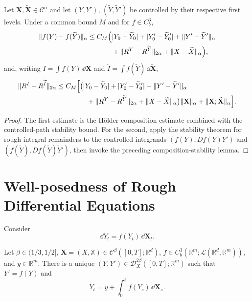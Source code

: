 \begin{lem}
Let $\mathbf X,\widetilde{\mathbf X}\in\mathscr C^\alpha$ and let
$(Y,Y')$, $(\widetilde Y,\widetilde Y')$ be controlled by their respective
first levels.  Under a common bound $M$ and for $f\in C_b^3$,
\begin{align*}
\|f(Y)-f(\widetilde Y)\|_\alpha
\le C_M\Bigl(&|Y_0-\widetilde Y_0|+|Y'_0-\widetilde Y'_0|
 +\|Y'-\widetilde Y'\|_\alpha\\
&+\|R^Y-R^{\widetilde Y}\|_{2\alpha}
 +\|X-\widetilde X\|_\alpha\Bigr),
\end{align*}
and, writing
$I=\int f(Y)\,\dd\mathbf X$ and
$\widetilde I=\int f(\widetilde Y)\,\dd\widetilde{\mathbf X}$,
\begin{align*}
\|R^I-R^{\widetilde I}\|_{2\alpha}
\le C_M\Bigl[&
 \bigl(|Y_0-\widetilde Y_0|+|Y'_0-\widetilde Y'_0|
 +\|Y'-\widetilde Y'\|_\alpha\\
&\quad+\|R^Y-R^{\widetilde Y}\|_{2\alpha}
 +\|X-\widetilde X\|_\alpha\bigr)\|\mathbf X\|_\alpha
 +\|\mathbf X;\widetilde{\mathbf X}\|_\alpha\Bigr].
\end{align*}
\end{lem}

\begin{proof}
The first estimate is the Hölder composition estimate combined with the
controlled-path stability bound.  For the second, apply the stability theorem
for rough-integral remainders to the controlled integrands
$(f(Y),Df(Y)Y')$ and
$(f(\widetilde Y),Df(\widetilde Y)\widetilde Y')$, then invoke the preceding
composition-stability lemma.
\end{proof}

\section{Well-posedness of Rough Differential Equations}

Consider
\[
  \dd Y_t=f(Y_t)\,\dd\mathbf X_t.
\]

\begin{thm}
Let $\beta\in(1/3,1/2]$,
$\mathbf X=(X,\mathbb X)\in\mathscr C^\beta([0,T];\mathbb R^d)$,
$f\in C_b^3(\mathbb R^m;\mathcal L(\mathbb R^d,\mathbb R^m))$, and
$y\in\mathbb R^m$.  There is a unique
$(Y,Y')\in\mathscr D_X^{2\beta}([0,T];\mathbb R^m)$ such that
$Y'=f(Y)$ and
\[
  Y_t=y+\int_0^t f(Y_s)\,\dd\mathbf X_s.
\]
\end{thm}


